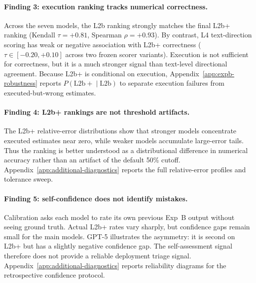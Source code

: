 \documentclass{article}
\begin{document}
\paragraph{Finding 3: execution ranking tracks numerical correctness.}
Across the seven models, the L2b ranking strongly matches the final L2b+
ranking (Kendall $\tau=+0.81$, Spearman $\rho=+0.93$). By contrast, L4
text-direction scoring has weak or negative association with L2b+
correctness ($\tau\in[-0.20,+0.10]$ across two frozen scorer variants).
Execution is not sufficient for correctness, but it is a much stronger
signal than text-level directional agreement. Because L2b+ is conditional
on execution, Appendix~\ref{app:expb-robustness} reports
$P(\mathrm{L2b+}\mid\mathrm{L2b})$ to separate execution failures from
executed-but-wrong estimates.

\paragraph{Finding 4: L2b+ rankings are not threshold artifacts.}
The L2b+ relative-error distributions show that stronger models
concentrate executed estimates near zero, while weaker models accumulate
large-error tails. Thus the ranking is better understood as a
distributional difference in numerical accuracy rather than an artifact
of the default 50\% cutoff. Appendix~\ref{app:additional-diagnostics}
reports the full relative-error profiles and tolerance sweep.

\paragraph{Finding 5: self-confidence does not identify mistakes.}
Calibration asks each model to rate its own previous Exp~B output
without seeing ground truth. Actual L2b+ rates vary sharply, but
confidence gaps remain small for the main models. GPT-5 illustrates
the asymmetry: it is second on L2b+ but has a slightly negative
confidence gap. The self-assessment signal therefore does not provide
a reliable deployment triage signal.
Appendix~\ref{app:additional-diagnostics} reports reliability diagrams
for the retrospective confidence protocol.
\end{document}

